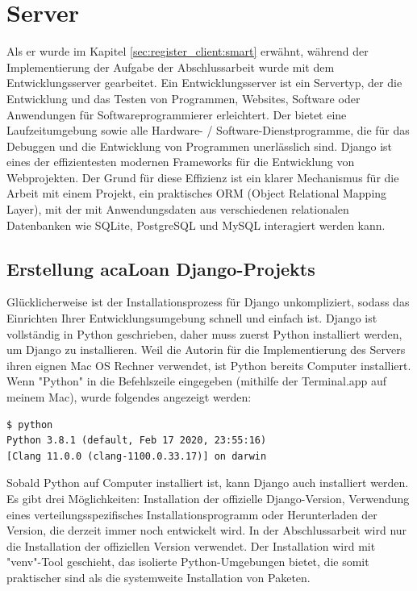 \section{Server}
\label{sec:server}
Als er wurde im Kapitel \ref{sec:register_client:smart} erwähnt, während der Implementierung der Aufgabe der Abschlussarbeit wurde mit dem Entwicklungsserver gearbeitet. Ein Entwicklungsserver ist ein Servertyp, der die Entwicklung und das Testen von Programmen, Websites, Software oder Anwendungen für Softwareprogrammierer erleichtert. Der bietet eine Laufzeitumgebung sowie alle Hardware- / Software-Dienstprogramme, die für das Debuggen und die Entwicklung von Programmen unerlässlich sind. Django ist eines der effizientesten modernen Frameworks für die Entwicklung von Webprojekten. Der Grund für diese Effizienz ist ein klarer Mechanismus für die Arbeit mit einem Projekt, ein praktisches ORM (Object Relational Mapping Layer), mit der mit Anwendungsdaten aus verschiedenen relationalen Datenbanken wie SQLite, PostgreSQL und MySQL interagiert werden kann.

\subsection{Erstellung acaLoan Django-Projekts}
\label{sec:server:install}
Glücklicherweise ist der Installationsprozess für Django unkompliziert, sodass das Einrichten Ihrer Entwicklungsumgebung schnell und einfach ist. Django ist vollständig in Python geschrieben, daher muss zuerst Python installiert werden, um Django zu installieren. Weil die Autorin für die Implementierung des Servers ihren eignen Mac OS Rechner verwendet, ist Python bereits Computer installiert. Wenn "Python" in die Befehlszeile eingegeben (mithilfe der Terminal.app auf meinem Mac), wurde folgendes angezeigt werden:
\begin{lstlisting}
$ python
Python 3.8.1 (default, Feb 17 2020, 23:55:16) 
[Clang 11.0.0 (clang-1100.0.33.17)] on darwin
\end{lstlisting}

Sobald Python auf Computer installiert ist, kann Django auch installiert werden. Es gibt drei Möglichkeiten: Installation der offizielle Django-Version, Verwendung eines verteilungsspezifisches Installationsprogramm oder Herunterladen der Version, die derzeit immer noch entwickelt wird. In der Abschlussarbeit wird nur die Installation der offiziellen Version verwendet. Der Installation wird mit "venv"-Tool geschieht, das isolierte Python-Umgebungen bietet, die somit praktischer sind als die systemweite Installation von Paketen. 

